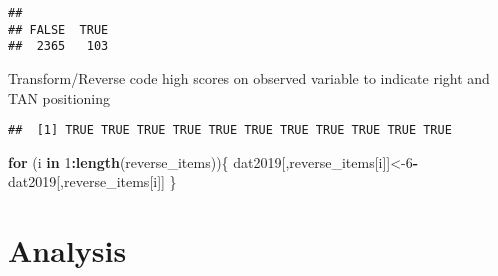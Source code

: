 \documentclass[
]{article}
\newenvironment{Shaded}{\begin{snugshade}}{\end{snugshade}}
\newcommand{\ControlFlowTok}[1]{\textcolor[rgb]{0.13,0.29,0.53}{\textbf{#1}}}
\newcommand{\DecValTok}[1]{\textcolor[rgb]{0.00,0.00,0.81}{#1}}
\newcommand{\KeywordTok}[1]{\textcolor[rgb]{0.13,0.29,0.53}{\textbf{#1}}}
\newcommand{\NormalTok}[1]{#1}
\newcommand{\OperatorTok}[1]{\textcolor[rgb]{0.81,0.36,0.00}{\textbf{#1}}}
\newcommand{\StringTok}[1]{\textcolor[rgb]{0.31,0.60,0.02}{#1}}
\begin{document}
\begin{verbatim}
## 
## FALSE  TRUE 
##  2365   103
\end{verbatim}

\begin{Shaded}
\end{Shaded}

Transform/Reverse code high scores on observed variable to indicate
right and TAN positioning

\begin{Shaded}
\end{Shaded}

\begin{verbatim}
##  [1] TRUE TRUE TRUE TRUE TRUE TRUE TRUE TRUE TRUE TRUE TRUE
\end{verbatim}

\begin{Shaded}
\begin{Highlighting}[]
\ControlFlowTok{for}\NormalTok{ (i }\ControlFlowTok{in} \DecValTok{1}\OperatorTok{:}\KeywordTok{length}\NormalTok{(reverse_items))\{}
\NormalTok{  dat2019[,reverse_items[i]]<-}\DecValTok{6}\OperatorTok{-}\NormalTok{dat2019[,reverse_items[i]]}
\NormalTok{\}}
\end{Highlighting}
\end{Shaded}

\newpage

\hypertarget{analysis}{%
\section{Analysis}\label{analysis}}
\end{document}

